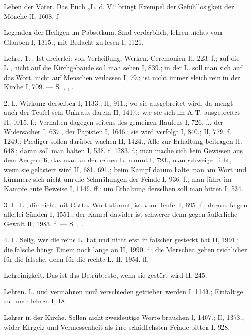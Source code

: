 Leben der Väter. Das Buch „L. d. V.“ bringt Exempel der Gefühllosigkeit der Mönche II, 1608. f.

Legenden der Heiligen im Pabstthum. Sind verderblich, lehren nichts vom Glauben I, 1315.; mit Bedacht zu lesen I, 1121.

Lehre. 1. . Ist dreierlei: von Verheißung, Werken, Ceremonien II, 223. f.; auf die L., nicht auf die Kirchgebäude soll man sehen I, 839.; in der L. soll man sich auf das Wort, nicht auf Menschen verlassen I, 79.; ist nicht immer gleich rein in der Kirche I, 709. — S. , , .

2.  L. Wirkung derselben I, 1133.; II, 911.; wo sie ausgebreitet wird, da mengt auch der Teufel sein Unkraut darein II, 1417.; wie sie sich im A.\,T. ausgebreitet II, 1015. f.; Verhalten dagegen seitens des gemeinen Haufens I, 726. f., der Widersacher I, 637., der Papisten I, 1646.; sie wird verfolgt I, 840.; II, 779. f. 1249.; Prediger sollen darüber wachen II, 1424., Alle zur Erhaltung beitragen II, 648.; daran soll man halten I, 538. f. 1283. f.; man mache sich kein Gewissen aus dem Aergerniß, das man an der reinen L. nimmt I, 793.; man schweige nicht, wenn sie gelästert wird II, 681. 691.; beim Kampf darum halte man am Wort und kümmere sich nicht um die Schmähungen der Feinde I, 936. f.; man führe im Kampfe gute Beweise I, 1149. ff.; um Erhaltung derselben soll man bitten I, 534.

3.  L. L., die nicht mit Gottes Wort stimmt, ist vom Teufel I, 695. f.; daraus folgen allerlei Sünden I, 1551.; der Kampf dawider ist schwerer denn gegen äußerliche Gewalt II, 1983. f. — S. , .

4.  L. Selig, wer die reine L. hat und nicht erst in falscher gesteckt hat II, 1991.; die falsche hängt Einem noch lange an II, 1990. f.; die Menschen geben reichlicher für die falsche, denn für die rechte L. II, 1954. ff.

Lehreinigkeit. Das ist das Betrübteste, wenn sie gestört wird II, 245.

Lehren. L. und vermahnen muß verschieden getrieben werden I, 1149.; Einfältige soll man lehren I, 18.

Lehrer in der Kirche. Sollen nicht zweideutige Worte brauchen I, 1407.; II, 1373., wider Ehrgeiz und Vermessenheit als ihre schädlichsten Feinde bitten I, 928.

